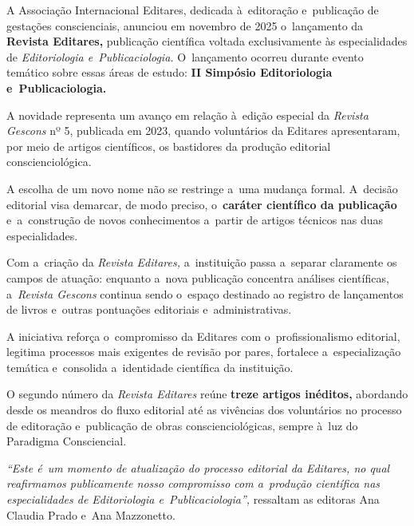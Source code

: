 \documentclass{gescons}
\begin{document}
    \begin{multicols}{2}


A Associação Internacional Editares, dedicada à~editoração e~publicação de gestações conscienciais, anunciou em novembro de 2025 o~lançamento da \textbf{Revista Editares,} publicação científica voltada exclusivamente às especialidades de \emph{Editoriologia e~Publicaciologia.} O~lançamento ocorreu durante evento temático sobre essas áreas de estudo: \textbf{II Simpósio Editoriologia e~Publicaciologia.}

A novidade representa um avanço em relação à~edição especial da \emph{Revista Gescons} nº 5, publicada em 2023, quando voluntários da Editares apresentaram, por meio de artigos científicos, os bastidores da produção editorial conscienciológica.

A escolha de um novo nome não se restringe a~uma mudança formal. A~decisão editorial visa demarcar, de modo preciso, o~\textbf{caráter científico da publicação} e~a~construção de novos conhecimentos a~partir de artigos técnicos nas duas especialidades.

Com a~criação da \emph{Revista Editares,} a~instituição passa a~separar claramente os campos de atuação: enquanto a~nova publicação concentra análises científicas, a~\emph{Revista Gescons} continua sendo o~espaço destinado ao registro de lançamentos de livros e~outras pontuações editoriais e~administrativas.

A iniciativa reforça o~compromisso da Editares com o~profissionalismo editorial, legitima processos mais exigentes de revisão por pares, fortalece a~especialização temática e~consolida a~identidade científica da instituição.

O segundo número da \emph{Revista Editares} reúne \textbf{treze artigos inéditos,} abordando desde os meandros do fluxo editorial até as vivências dos voluntários no processo de editoração e~publicação de obras conscienciológicas, sempre à~luz do Paradigma Consciencial.

\emph{``Este é~um momento de atualização do processo editorial da Editares, no qual reafirmamos publicamente nosso compromisso com a~produção científica nas especialidades de Editoriologia e~Publicaciologia'',} ressaltam as editoras Ana Claudia Prado e~Ana Mazzonetto.









    \end{multicols}
\end{document}
